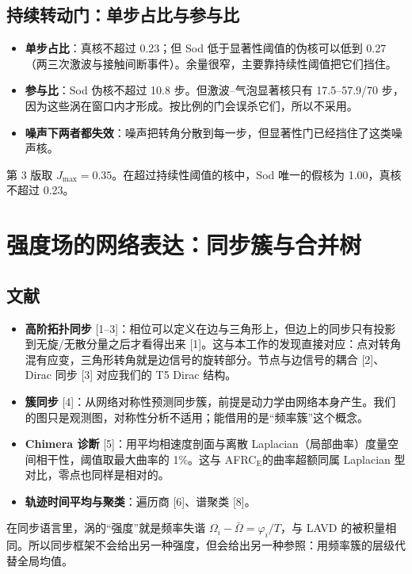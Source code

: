 \documentclass[10.5pt,a4paper]{article}
\newcommand{\AFE}{AFRC$_{\mathrm E}$}
\newcommand{\keyp}[1]{\textbf{\sffamily #1}}
\theoremstyle{definition}
\theoremstyle{plain}
\theoremstyle{remark}
\begin{document}
\subsection{持续转动门：单步占比与参与比}
\begin{table}[H]\centering\small\caption{干净数据上前 40 个核的单步占比与参与比 $n_{\rm eff}=(\sum|x|)^2/\sum x^2$。}\resizebox{\linewidth}{!}{}\end{table}
\begin{itemize}
\item \keyp{单步占比}：真核不超过 0.23；但 Sod 低于显著性阈值的伪核可以低到 0.27（两三次激波与接触间断事件）。余量很窄，主要靠持续性阈值把它们挡住。
\item \keyp{参与比}：Sod 伪核不超过 10.8 步。但激波–气泡显著核只有 17.5–57.9/70 步，因为这些涡在窗口内才形成。按比例的门会误杀它们，所以不采用。
\item \keyp{噪声下两者都失效}：噪声把转角分散到每一步，但显著性门已经挡住了这类噪声核。
\end{itemize}
第 3 版取 $J_{\max}=0.35$。在超过持续性阈值的核中，Sod 唯一的假核为 1.00，真核不超过 0.23。

\section{强度场的网络表达：同步簇与合并树}
\subsection{文献}
\begin{itemize}
\item \keyp{高阶拓扑同步} [1–3]：相位可以定义在边与三角形上，但边上的同步只有投影到无旋/无散分量之后才看得出来 [1]。这与本工作的发现直接对应：点对转角混有应变，三角形转角就是边信号的旋转部分。节点与边信号的耦合 [2]、Dirac 同步 [3] 对应我们的 T5 Dirac 结构。
\item \keyp{簇同步} [4]：从网络对称性预测同步簇，前提是动力学由网络本身产生。我们的图只是观测图，对称性分析不适用；能借用的是“频率簇”这个概念。
\item \keyp{Chimera 诊断} [5]：用平均相速度剖面与离散 Laplacian（局部曲率）度量空间相干性，阈值取最大曲率的 1\%。这与 \AFE 的曲率超额同属 Laplacian 型对比，零点也同样是相对的。
\item \keyp{轨迹时间平均与聚类}：遍历商 [6]、谱聚类 [8]。
\end{itemize}
在同步语言里，涡的“强度”就是频率失谐 $\Omega_i-\bar\Omega=\varphi_i/T$，与 LAVD 的被积量相同。所以同步框架不会给出另一种强度，但会给出另一种参照：用频率簇的层级代替全局均值。
\end{document}
